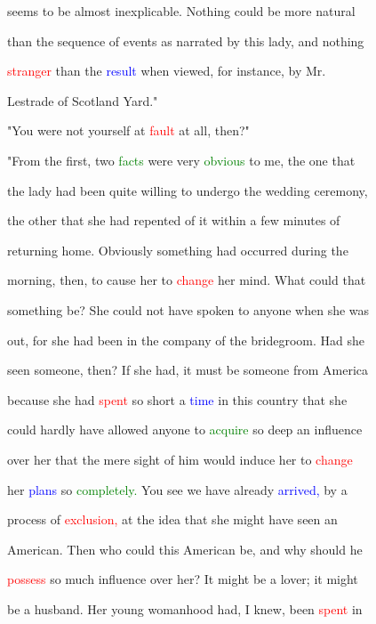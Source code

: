  seems to be almost \textcolor{BurntOrange}{inexplicable.} Nothing could be more natural

 than the sequence of events as narrated by this lady, and nothing

 \textcolor{red}{stranger} than the \textcolor{blue}{result} when viewed, for instance, by Mr.

 Lestrade of Scotland Yard."



 "You were not yourself at \textcolor{red}{fault} at all, then?"



 "From the first, two \textcolor{green}{facts} were very \textcolor{green}{obvious} to me, the one that

 the lady had been quite willing to undergo the wedding \textcolor{BurntOrange}{ceremony,}

 the other that she had \textcolor{BurntOrange}{repented} of it within a few minutes of

 returning home. Obviously something had occurred during the

 morning, then, to cause her to \textcolor{red}{change} her mind. What could that

 something be? She could not have spoken to anyone when she was

 out, for she had been in the company of the \textcolor{BurntOrange}{bridegroom.} Had she

 seen someone, then? If she had, it must be someone from America

 because she had \textcolor{red}{spent} so short a \textcolor{blue}{time} in this country that she

 could hardly have allowed anyone to \textcolor{green}{acquire} so deep an \textcolor{BurntOrange}{influence}

 over her that the mere sight of him would induce her to \textcolor{red}{change}

 her \textcolor{blue}{plans} so \textcolor{green}{completely.} You see we have already \textcolor{blue}{arrived,} by a

 process of \textcolor{red}{exclusion,} at the idea that she might have seen an

 American. Then who could this American be, and why should he

 \textcolor{red}{possess} so much \textcolor{BurntOrange}{influence} over her? It might be a \textcolor{BurntOrange}{lover;} it might

 be a husband. Her \textcolor{BurntOrange}{young} womanhood had, I knew, been \textcolor{red}{spent} in

